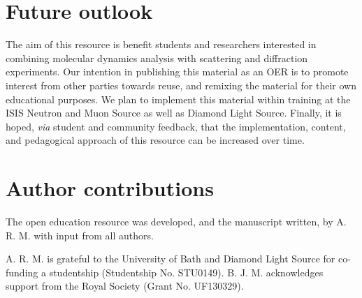 \documentclass[amsmath,amssymb,twocolumn,superscriptaddress]{revtex4-1}
\begin{document}
\section{Future outlook}

The aim of this resource is benefit students and researchers interested in combining molecular dynamics analysis with scattering and diffraction experiments.
Our intention in publishing this material as an OER is to promote interest from other parties towards reuse, and remixing the material for their own educational purposes.
We plan to implement this material within training at the ISIS Neutron and Muon Source as well as Diamond Light Source.
Finally, it is hoped, \textit{via} student and community feedback, that the implementation, content, and pedagogical approach of this resource can be increased over time.

\section{Author contributions}

The open education resource was developed, and the manuscript written, by A. R. M. with input from all authors.

\begin{acknowledgements}
A. R. M. is grateful to the University of Bath and Diamond Light Source for co-funding a studentship (Studentship No. STU0149).
B. J. M. acknowledges support from the Royal Society (Grant No. UF130329).
\end{acknowledgements}


\end{document}
